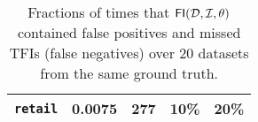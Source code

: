 \begin{table}[htbp]
\begin{tabular}{llrrr}
\midrule
\texttt{retail} & 0.0075 & 277 & 10\% & 20\% \\
\bottomrule
\end{tabular}
\caption{Fractions of times that $\mathsf{FI}({\cal D},{\cal I},\theta)$ contained false positives
and missed TFIs (false negatives) over 20 datasets from the same ground truth.}
\label{table:fp}
\end{table}


